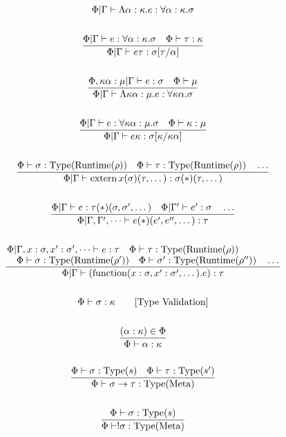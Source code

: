 \documentclass {article}
\begin{document}
\begin{gather*}
{\Phi | \Gamma \vdash \Lambda \alpha : \kappa. e : \forall \alpha : \kappa. \sigma } \\
\\
\frac
{\Phi | \Gamma \vdash e : \forall \alpha : \kappa. \sigma \quad \Phi \vdash \tau : \kappa }
{\Phi | \Gamma \vdash e \tau : \sigma [\tau/\alpha] } \\
\\
\frac
{\Phi, \kappa \alpha : \mu | \Gamma \vdash e : \sigma \quad \Phi \vdash \mu}
{\Phi | \Gamma \vdash \Lambda \kappa \alpha : \mu. e : \forall \kappa \alpha. \sigma} \\
\\
\frac
{\Phi | \Gamma \vdash e : \forall \kappa \alpha : \mu. \sigma \quad \Phi \vdash \kappa : \mu}
{\Phi | \Gamma \vdash e \kappa : \sigma [\kappa/\kappa \alpha]} \\
\\
\frac
{\Phi \vdash \sigma : \text{Type}(\text{Runtime} (\rho)) \quad \Phi \vdash \tau : \text{Type}(\text{Runtime} (\rho)) \quad \dots}
{\Phi | \Gamma \vdash \text{extern} \, x ( \sigma )(\tau, \dots) : \sigma (*)(\tau, \dots)} \\
\\
\frac
{\Phi | \Gamma \vdash e : \tau(*)(\sigma, \sigma', \dots) \quad \Phi | \Gamma' \vdash e' : \sigma \quad \dots}
{\Phi | \Gamma, \Gamma', \dots \vdash e(*)(e',e'',\dots) : \tau} \\
\\
\frac
{\splitfrac
{\Phi | \Gamma, x : \sigma, x' : \sigma', \dots \vdash e : \tau \quad \Phi \vdash \tau : \text{Type}(\text{Runtime}(\rho))}
{\Phi \vdash \sigma : \text{Type}(\text{Runtime}(\rho')) \quad \Phi \vdash \sigma' : \text{Type}(\text{Runtime}(\rho'')) \quad\dots }}
{\Phi | \Gamma \vdash (\text{function}(x : \sigma, x' : \sigma', \dots). e) : \tau } \\
\\
\Phi \vdash \sigma : \kappa \tag* {[\text{Type Validation}]} \\
\\
\frac
{(\alpha : \kappa) \in \Phi}
{\Phi \vdash \alpha : \kappa} \\
\\
\frac
{\Phi \vdash \sigma : \text{Type} (s) \quad \Phi \vdash \tau : \text{Type} (s')}
{\Phi \vdash \sigma \to \tau : \text{Type} (\text{Meta})} \\
\\
\frac
{\Phi \vdash \sigma : \text{Type} (s)}
{\Phi \vdash !\sigma : \text{Type} (\text{Meta})} \\

\end{gather*}
\end{document}
